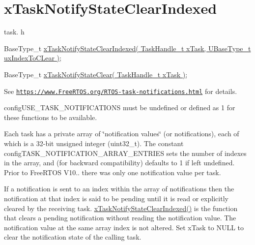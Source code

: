 \hypertarget{group__x_task_notify_state_clear_indexed}{}\section{x\+Task\+Notify\+State\+Clear\+Indexed}
\label{group__x_task_notify_state_clear_indexed}
task. h 
\begin{DoxyPre}
BaseType\_t \hyperlink{externals_2freertos_2include_2task_8h_ad7fc12476fa032389e0b3dd52ecb709f}{xTaskNotifyStateClearIndexed( TaskHandle\_t xTask, UBaseType\_t uxIndexToCLear )};\end{DoxyPre}



\begin{DoxyPre}BaseType\_t \hyperlink{externals_2freertos_2include_2task_8h_ad4a465a489d7c2b22130ec2cc68b3284}{xTaskNotifyStateClear( TaskHandle\_t xTask )};
\end{DoxyPre}


See \href{https://www.FreeRTOS.org/RTOS-task-notifications.html}{\tt https\+://www.\+Free\+R\+T\+O\+S.\+org/\+R\+T\+O\+S-\/task-\/notifications.\+html} for details.

config\+U\+S\+E\+\_\+\+T\+A\+S\+K\+\_\+\+N\+O\+T\+I\+F\+I\+C\+A\+T\+I\+O\+NS must be undefined or defined as 1 for these functions to be available.

Each task has a private array of \char`\"{}notification values\char`\"{} (or \textquotesingle{}notifications\textquotesingle{}), each of which is a 32-\/bit unsigned integer (uint32\+\_\+t). The constant config\+T\+A\+S\+K\+\_\+\+N\+O\+T\+I\+F\+I\+C\+A\+T\+I\+O\+N\+\_\+\+A\+R\+R\+A\+Y\+\_\+\+E\+N\+T\+R\+I\+ES sets the number of indexes in the array, and (for backward compatibility) defaults to 1 if left undefined. Prior to Free\+R\+T\+OS V10.. there was only one notification value per task.

If a notification is sent to an index within the array of notifications then the notification at that index is said to be \textquotesingle{}pending\textquotesingle{} until it is read or explicitly cleared by the receiving task. \hyperlink{externals_2freertos_2include_2task_8h_ad7fc12476fa032389e0b3dd52ecb709f}{x\+Task\+Notify\+State\+Clear\+Indexed()} is the function that clears a pending notification without reading the notification value. The notification value at the same array index is not altered. Set x\+Task to N\+U\+LL to clear the notification state of the calling task.

